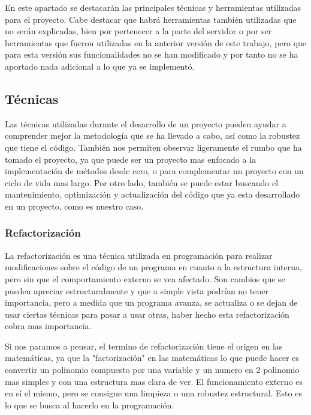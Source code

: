 

En este apartado se destacarán las principales técnicas y herramientas utilizadas para el proyecto. Cabe destacar que habrá herramientas también utilizadas que no serán explicadas, bien por pertenecer a la parte del servidor o por ser herramientas que fueron utilizadas en la anterior versión de este trabajo, pero que para esta versión sus funcionalidades no se han modificado y por tanto no se ha aportado nada adicional a lo que ya se implementó.

\subsection{Técnicas}

Las técnicas utilizadas durante el desarrollo de un proyecto pueden ayudar a comprender mejor la metodología que se ha llevado a cabo, así como la robustez que tiene el código. También nos permiten observar ligeramente el rumbo que ha tomado el proyecto, ya que puede ser un proyecto mas enfocado a la implementación de métodos desde cero, o para complementar un proyecto con un ciclo de vida mas largo. Por otro lado, también se puede estar buscando el mantenimiento, optimización y actualización del código que ya esta desarrollado en un proyecto, como es nuestro caso.

\subsubsection{Refactorización}

La refactorización es una técnica utilizada en programación para realizar modificaciones sobre el código de un programa en cuanto a la estructura interna, pero sin que el comportamiento externo se vea afectado. Son cambios que se pueden apreciar estructuralmente y que a simple vista podrían no tener importancia, pero a medida que un programa avanza, se actualiza o se dejan de usar ciertas técnicas para pasar a usar otras, haber hecho esta refactorización cobra mas importancia. 

Si nos paramos a pensar, el termino de refactorización tiene el origen en las matemáticas, ya que la "factorización" en las matemáticas lo que puede hacer es convertir un polinomio compuesto por una variable y un numero en 2 polinomio mas simples y con una estructura mas clara de ver. El funcionamiento externo es en sí el mismo, pero se consigue una limpieza o una robustez estructural. Esto es lo que se busca al hacerlo en la programación.

